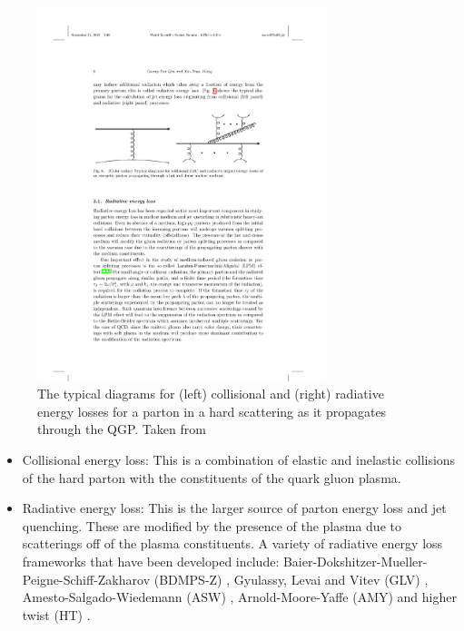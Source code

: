 \begin{figure}[htbp]
\begin{center}
\includegraphics[width=0.75\textwidth]{figures/theory/jetEnergyLoss}
\caption{The typical diagrams for (left) collisional and (right) radiative energy losses for a parton in a hard scattering as it propagates through the QGP. Taken from \cite{Qin:2015srf}}
\label{fig:jetEnergyLoss}
\end{center}
\end{figure}

\begin{itemize}
\item Collisional energy loss: This is a combination of elastic and inelastic collisions of the hard parton with the constituents of the quark gluon plasma. 
\item Radiative energy loss: This is the larger source of parton energy loss and jet quenching. These are modified by the presence of the plasma due to scatterings off of the plasma constituents. A variety of radiative energy loss frameworks that have been developed include: Baier-Dokshitzer-Mueller-Peigne-Schiff-Zakharov (BDMPS-Z) \cite{BAIER1997291}, Gyulassy, Levai and Vitev (GLV) \cite{Gyulassy:1999zd}, Amesto-Salgado-Wiedemann (ASW) \cite{Wiedemann:2000za},  Arnold-Moore-Yaffe (AMY) \cite{Arnold:2001ba} and higher twist (HT) \cite{Guo:2000nz}.
\end{itemize}

